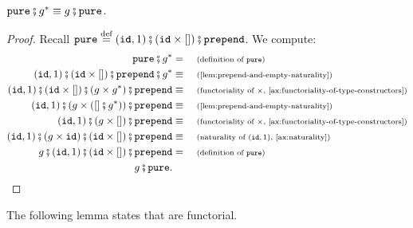 \begin{lemma}\label{lem:pure-naturality}
    $\pureterm \comp g^* \equiv g \comp \pureterm$.
\end{lemma}
\begin{proof}
    Recall $\pureterm \eqdef \appendoneterm \comp (\idterm \times []) \comp \prependterm$. We compute:
    \begin{align*}
        \pureterm \comp g^* &= \why{definition of $\pureterm$} \\
        \appendoneterm \comp (\idterm \times []) \comp \prependterm \comp g^* \equalbecause{\cref{lem:prepend-and-empty-naturality}} \\
        \appendoneterm \comp (\idterm \times []) \comp (g \times g^*) \comp \prependterm \equalbecause{functoriality of $\times$, \cref{ax:functoriality-of-type-constructors}} \\
        \appendoneterm \comp (g \times ([] \comp g^*)) \comp \prependterm \equalbecause{\cref{lem:prepend-and-empty-naturality}} \\
        \appendoneterm \comp (g \times []) \comp \prependterm \equalbecause{functoriality of $\times$, \cref{ax:functoriality-of-type-constructors}} \\
        \appendoneterm \comp (g \times \idterm) \comp (\idterm \times []) \comp \prependterm \equalbecause{naturality of $\appendoneterm$, \cref{ax:naturality}} \\
        g \comp \appendoneterm \comp (\idterm \times []) \comp \prependterm &= \why{definition of $\pureterm$} \\
        g \comp \pureterm.
    \end{align*}
\end{proof}

The following lemma states that  are functorial.

